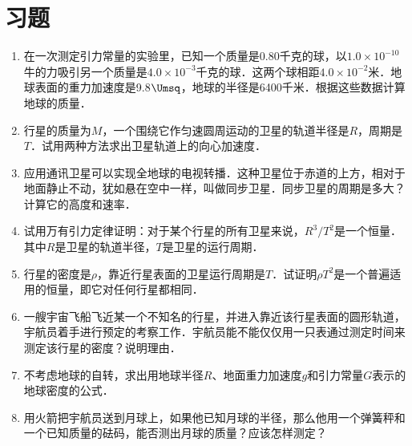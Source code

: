 \section*{习题}
\begin{enumerate}
	\item 在一次测定引力常量的实验里，已知一个质量是0.80千克的球，以$1.0\times 10^{-10}$牛的力吸引另一个质量是$4.0\times 10^{-3}$千克的球．这两个球相距$4.0\times 10^{-2}$米．地球表面的重力加速度是9.8$\Umsq$，地球的半径是6400千米．根据这些数据计算地球的质量．
	\item 行星的质量为$M$，一个围绕它作匀速圆周运动的卫星的轨道半径是$R$，周期是$T$．试用两种方法求出卫星轨道上的向心加速度．	
	\item 应用通讯卫星可以实现全地球的电视转播．这种卫星位于赤道的上方，相对于地面静止不动，犹如悬在空中一样，叫做同步卫星．同步卫星的周期是多大？计算它的高度和速率．
	\item 试用万有引力定律证明：对于某个行星的所有卫星来说，$R^3/T^2$是一个恒量．其中$R$是卫星的轨道半径，$T$是卫星的运行周期．
	\item 行星的密度是$\rho$，靠近行星表面的卫星运行周期是$T$．试证明$\rho T^2$是一个普遍适用的恒量，即它对任何行星都相同．
	\item 一艘宇宙飞船飞近某一个不知名的行星，并进入靠近该行星表面的圆形轨道，宇航员着手进行预定的考察工作．宇航员能不能仅仅用一只表通过测定时间来测定该行星的密度？说明理由．
	\item 不考虑地球的自转，求出用地球半径$R$、地面重力加速度$g$和引力常量$G$表示的地球密度的公式．
	\item 用火箭把宇航员送到月球上，如果他已知月球的半径，那么他用一个弹簧秤和一个已知质量的砝码，能否测出月球的质量？应该怎样测定？	


\end{enumerate}





